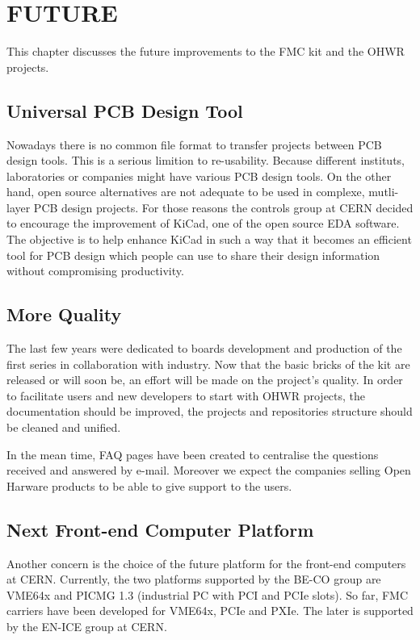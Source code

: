 \documentclass{JAC2003}
\begin{document}
\section{FUTURE}
This chapter discusses the future improvements to the FMC kit and the OHWR projects.

\subsection{Universal PCB Design Tool}
Nowadays there is no common file format to transfer projects between PCB design tools.
This is a serious limition to re-usability.
Because different instituts, laboratories or companies might have various PCB design tools.
On the other hand, open source alternatives are not adequate to be used in complexe, mutli-layer PCB design projects.
For those reasons the controls group at CERN decided to encourage the improvement of KiCad, one of the open source EDA software.
The objective is to help enhance KiCad in such a way that it becomes an efficient tool for PCB design which people can use to share their design information without compromising productivity.

\subsection{More Quality}
The last few years were dedicated to boards development and production of the first series in collaboration with industry.
Now that the basic bricks of the kit are released or will soon be, an effort will be made on the project's quality.
In order to facilitate users and new developers to start with OHWR projects, the documentation should be improved, the projects and repositories structure should be cleaned and unified.

In the mean time, FAQ pages have been created to centralise the questions received and answered by e-mail.
Moreover we expect the companies selling Open Harware products to be able to give support to the users.

\subsection{Next Front-end Computer Platform}
Another concern is the choice of the future platform for the front-end computers at CERN.
Currently, the two platforms supported by the BE-CO group are VME64x and PICMG 1.3 (industrial PC with PCI and PCIe slots).
So far, FMC carriers have been developed for VME64x, PCIe and PXIe. The later is supported by the EN-ICE group at CERN.
\end{document}
